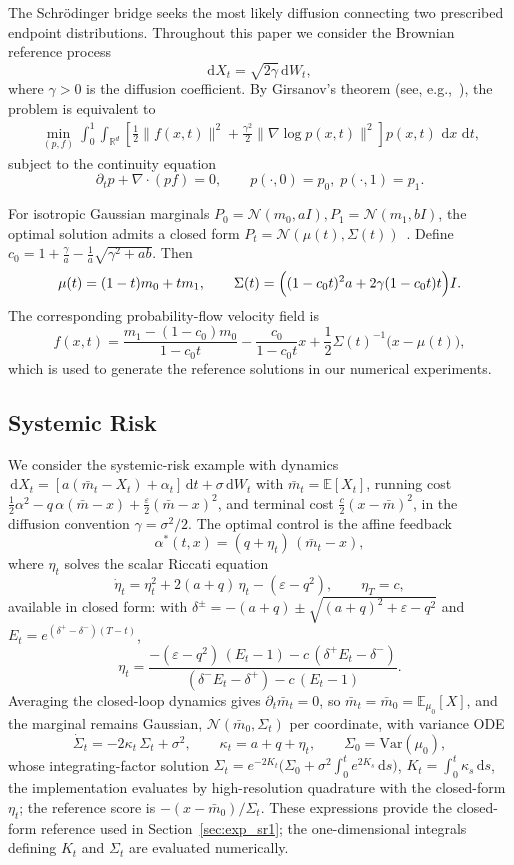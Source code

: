 \documentclass[preprint]{elsarticle}
\newcommand{\rd}{\mathrm{d}}
\newcommand{\dd}{\,\mathrm{d}}          \newcommand{\pdv}[2]{\dfrac{\partial #1}{\partial #2}}
\newcommand{\E}{\mathbb{E}}
\newcommand{\g}{\gamma}
\newcommand{\sN}{\mathcal{N}}
\begin{document}
The Schr\"odinger bridge seeks the most likely diffusion connecting two prescribed endpoint distributions. Throughout this paper we consider the Brownian reference process
\[
\rd X_t=\sqrt{2\gamma}\,\rd W_t,
\]
where $\gamma>0$ is the diffusion coefficient. By Girsanov's theorem (see, e.g.,~\cite{chen2016relation}), the problem is equivalent to
\begin{align}
\min_{(p,f)}
\int_0^1\!\!\int_{\mathbb R^d}
\left[
\frac12\|f(x,t)\|^2
+\frac{\gamma^2}{2}
\|\nabla\log p(x,t)\|^2
\right]
p(x,t)\,\dd x\,\dd t,
\end{align}
subject to the continuity equation
\[
\partial_tp+\nabla\!\cdot(p f)=0,
\qquad
p(\cdot,0)=p_0,\;
p(\cdot,1)=p_1.
\]

For isotropic Gaussian marginals $P_0=\mathcal N(m_0,aI), P_1=\mathcal N(m_1,bI)$, the optimal solution admits a closed form $P_t=\mathcal N(\mu(t), \Sigma(t))$~\cite{chen2016relation}. Define $c_0= 1+\frac{\gamma}{a}-\frac1a\sqrt{\gamma^2+ab}$. Then
\[
\mu(t)=(1-t)m_0+tm_1, \qquad
\Sigma(t)
=
\Bigl(
(1-c_0t)^2a
+2\gamma(1-c_0t)t
\Bigr)I.
\]
The corresponding probability-flow velocity field is
\[
f(x,t)
=
\frac{m_1-(1-c_0)m_0}{1-c_0t}
-\frac{c_0}{1-c_0t}x
+\frac12\Sigma(t)^{-1}
\bigl(x-\mu(t)\bigr),
\]
which is used to generate the reference solutions in our numerical experiments.

\subsection{Systemic Risk}\label{sec:appendix_exact_sr}

We consider the systemic-risk example with dynamics
$\dd X_t=[a(\bar m_t-X_t)+\alpha_t]\dd t+\sigma\dd W_t$
with $\bar m_t=\E[X_t]$, running cost
$\tfrac12\alpha^2-q\,\alpha(\bar m-x)+\tfrac{\varepsilon}{2}(\bar m-x)^2$,
and terminal cost $\tfrac{c}{2}(x-\bar m)^2$, in the diffusion convention $\g=\sigma^2/2$. The optimal control is the affine feedback
\[
\alpha^*(t,x) = (q+\eta_t)\,(\bar m_t - x),
\]
where $\eta_t$ solves the scalar Riccati equation
\[
\dot\eta_t = \eta_t^2 + 2(a+q)\,\eta_t - (\varepsilon - q^2),
\qquad \eta_T = c,
\]
available in closed form: with
$\delta^{\pm}=-(a+q)\pm\sqrt{(a+q)^2+\varepsilon-q^2}$
and
$E_t=e^{(\delta^+-\delta^-)(T-t)}$,
\[
\eta_t
= \frac{-(\varepsilon-q^2)\,(E_t-1) - c\,(\delta^+E_t-\delta^-)}
{(\delta^-E_t-\delta^+) - c\,(E_t-1)}.
\]
Averaging the closed-loop dynamics gives
$\partial_t\bar m_t=0$, so $\bar m_t=\bar m_0=\E_{\mu_0}[X]$, and the marginal remains Gaussian, $\sN(\bar m_0,\Sigma_t)$ per coordinate, with variance ODE
\[
\dot\Sigma_t = -2\kappa_t\,\Sigma_t + \sigma^2,
\qquad \kappa_t = a+q+\eta_t,
\qquad \Sigma_0 = \mathrm{Var}(\mu_0),
\]
whose integrating-factor solution $\Sigma_t = e^{-2K_t}\bigl(\Sigma_0+\sigma^2\int_0^t e^{2K_s}\dd s\bigr)$, $K_t=\int_0^t\kappa_s\dd s$, the implementation evaluates by high-resolution quadrature with the closed-form $\eta_t$; the reference score is $-(x-\bar m_0)/\Sigma_t$. These expressions provide the closed-form reference used in Section~\ref{sec:exp_sr1}; the one-dimensional integrals defining \(K_t\) and \(\Sigma_t\) are evaluated numerically.
\end{document}
